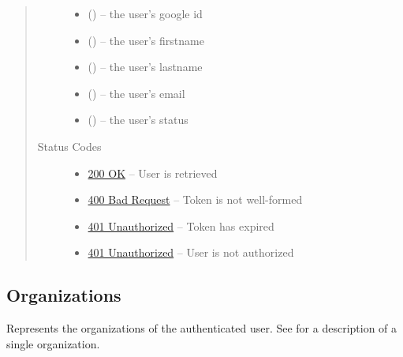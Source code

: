 \documentclass[letterpaper,10pt,english]{sphinxmanual}
\begin{document}
\begin{fulllineitems}
\begin{quote}
\begin{description}
\begin{itemize}
\item {} 
 () -- the user's google id

\item {} 
 () -- the user's firstname

\item {} 
 () -- the user's lastname

\item {} 
 () -- the user's email

\item {} 
 () -- the user's status

\end{itemize}

\item[{Status Codes}] \leavevmode\begin{itemize}
\item {} 
\href{http://www.w3.org/Protocols/rfc2616/rfc2616-sec10.html\#sec10.2.1}{200 OK} -- User is retrieved

\item {} 
\href{http://www.w3.org/Protocols/rfc2616/rfc2616-sec10.html\#sec10.4.1}{400 Bad Request} -- Token is not well-formed

\item {} 
\href{http://www.w3.org/Protocols/rfc2616/rfc2616-sec10.html\#sec10.4.2}{401 Unauthorized} -- Token has expired

\item {} 
\href{http://www.w3.org/Protocols/rfc2616/rfc2616-sec10.html\#sec10.4.2}{401 Unauthorized} -- User is not authorized

\end{itemize}

\end{description}\end{quote}

\end{fulllineitems}



\subsection{Organizations}
\label{\detokenize{resources/user:organizations}}
Represents the organizations of the authenticated user. See {\hyperref[\detokenize{resources/organization:organization}]{}} for a description of a single organization.
\end{document}
